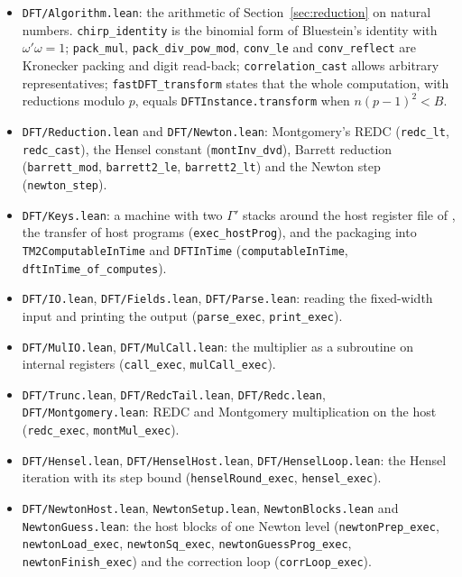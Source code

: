 \documentclass[11pt]{amsart}
\begin{document}
\begin{itemize}
\item \texttt{DFT/Algorithm.lean}: the arithmetic of Section~\ref{sec:reduction} on natural
  numbers. \texttt{chirp\_identity} is the binomial form of Bluestein's identity with
  $\omega'\omega = 1$; \texttt{pack\_mul}, \texttt{pack\_div\_pow\_mod}, \texttt{conv\_le} and
  \texttt{conv\_reflect} are Kronecker packing and digit read-back; \texttt{correlation\_cast}
  allows arbitrary representatives; \texttt{fastDFT\_transform} states that the whole
  computation, with reductions modulo $p$, equals \texttt{DFTInstance.transform} when
  $n(p-1)^2 < B$.
\item \texttt{DFT/Reduction.lean} and \texttt{DFT/Newton.lean}: Montgomery's REDC
  (\texttt{redc\_lt}, \texttt{redc\_cast}), the Hensel constant (\texttt{montInv\_dvd}), Barrett
  reduction (\texttt{barrett\_mod}, \texttt{barrett2\_le}, \texttt{barrett2\_lt}) and the Newton
  step (\texttt{newton\_step}).
\item \texttt{DFT/Keys.lean}: a machine with two $\Gamma'$ stacks around the host register file
  of \cite{IMB}, the transfer of host programs (\texttt{exec\_hostProg}), and the packaging into
  \texttt{TM2ComputableInTime} and \texttt{DFTInTime} (\texttt{computableInTime},
  \texttt{dftInTime\_of\_computes}).
\item \texttt{DFT/IO.lean}, \texttt{DFT/Fields.lean}, \texttt{DFT/Parse.lean}: reading the
  fixed-width input and printing the output (\texttt{parse\_exec}, \texttt{print\_exec}).
\item \texttt{DFT/MulIO.lean}, \texttt{DFT/MulCall.lean}: the multiplier as a subroutine on
  internal registers (\texttt{call\_exec}, \texttt{mulCall\_exec}).
\item \texttt{DFT/Trunc.lean}, \texttt{DFT/RedcTail.lean}, \texttt{DFT/Redc.lean},
  \texttt{DFT/Montgomery.lean}: REDC and Montgomery multiplication on the host
  (\texttt{redc\_exec}, \texttt{montMul\_exec}).
\item \texttt{DFT/Hensel.lean}, \texttt{DFT/HenselHost.lean}, \texttt{DFT/HenselLoop.lean}: the
  Hensel iteration with its step bound (\texttt{henselRound\_exec}, \texttt{hensel\_exec}).
\item \texttt{DFT/NewtonHost.lean}, \texttt{NewtonSetup.lean}, \texttt{NewtonBlocks.lean} and
  \texttt{NewtonGuess.lean}: the host blocks of one Newton level (\texttt{newtonPrep\_exec},
  \texttt{newtonLoad\_exec}, \texttt{newtonSq\_exec}, \texttt{newtonGuessProg\_exec},
  \texttt{newtonFinish\_exec}) and the correction loop (\texttt{corrLoop\_exec}).
\end{itemize}
\end{document}

